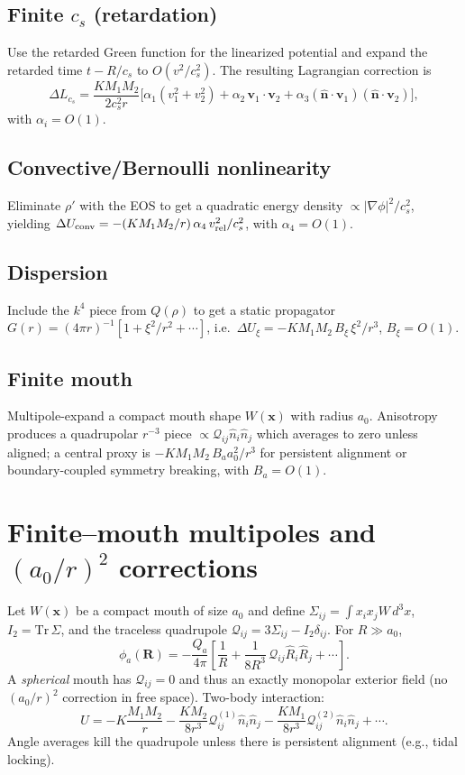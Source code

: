 \documentclass[11pt]{article}
\numberwithin{equation}{section}
\theoremstyle{plain}
\theoremstyle{remark}
\theoremstyle{definition}
\begin{document}
\subsection*{Finite $c_s$ (retardation)}
Use the retarded Green function for the linearized potential and expand the retarded time $t-R/c_s$ to $O(v^2/c_s^2)$. The resulting Lagrangian correction is
\begin{equation*}
\Delta L_{c_s}= \frac{K M_1M_2}{2 c_s^2 r}\big[\alpha_1(v_1^2+v_2^2)+\alpha_2\,\mathbf v_1\!\cdot\!\mathbf v_2+\alpha_3(\hat{\mathbf n}\!\cdot\!\mathbf v_1)(\hat{\mathbf n}\!\cdot\!\mathbf v_2)\big],
\end{equation*}
with $\alpha_i=O(1)$.

\subsection*{Convective/Bernoulli nonlinearity}
Eliminate $\rho'$ with the EOS to get a quadratic energy density $\propto |\nabla\phi|^2/c_s^2$, yielding $\Delta U_{\rm conv}=-(K M_1M_2/r)\,\alpha_4\,v_{\rm rel}^2/c_s^2$, with $\alpha_4=O(1)$.

\subsection*{Dispersion}
Include the $k^4$ piece from $Q(\rho)$ to get a static propagator $G(r)=(4\pi r)^{-1}[1+\xi^2/r^2+\cdots]$, i.e.\ $\Delta U_{\xi}=-K M_1M_2\,B_\xi\,\xi^2/r^3$, $B_\xi=O(1)$.

\subsection*{Finite mouth}
Multipole-expand a compact mouth shape $W(\mathbf x)$ with radius $a_0$. Anisotropy produces a quadrupolar $r^{-3}$ piece $\propto \mathcal Q_{ij}\hat n_i\hat n_j$ which averages to zero unless aligned; a central proxy is $-K M_1M_2\,B_a a_0^2/r^3$ for persistent alignment or boundary-coupled symmetry breaking, with $B_a=O(1)$.

\section{Finite–mouth multipoles and $(a_0/r)^2$ corrections}
\label{app:mouth}
Let $W(\mathbf x)$ be a compact mouth of size $a_0$ and define $\Sigma_{ij}=\int x_i x_j W\,d^3x$, $I_2=\mathrm{Tr}\,\Sigma$, and the traceless quadrupole $\mathcal Q_{ij}=3\Sigma_{ij}-I_2\delta_{ij}$. For $R\gg a_0$,
\begin{equation}
\phi_a(\mathbf R)=-\frac{Q_a}{4\pi}\left[\frac{1}{R}+\frac{1}{8R^3}\,\mathcal Q_{ij}\hat R_i\hat R_j+\cdots\right].
\end{equation}
A \emph{spherical} mouth has $\mathcal Q_{ij}=0$ and thus an exactly monopolar exterior field (no $(a_0/r)^2$ correction in free space). Two-body interaction:
\begin{equation}
U=-K\frac{M_1M_2}{r}-\frac{K M_2}{8 r^3}\mathcal Q^{(1)}_{ij}\hat n_i\hat n_j-\frac{K M_1}{8 r^3}\mathcal Q^{(2)}_{ij}\hat n_i\hat n_j+\cdots.
\end{equation}
Angle averages kill the quadrupole unless there is persistent alignment (e.g., tidal locking).
\end{document}
